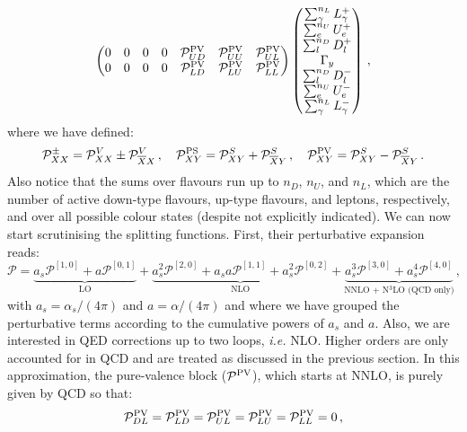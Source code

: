\documentclass[10pt,a4paper]{article}
\begin{document}
\begin{equation}
\begin{array}{rcl}
\begin{pmatrix}
0& 0& 0& 0 & \mathcal{P}^{\rm PV}_{UD} & \mathcal{P}^{\rm PV}_{UU} & \mathcal{P}^{\rm PV}_{UL}\\
0& 0&0 & 0 & \mathcal{P}^{\rm PV}_{LD} & \mathcal{P}^{\rm PV}_{LU} & \mathcal{P}^{\rm PV}_{LL}
\end{pmatrix}
\begin{pmatrix}
\sum_\gamma^{n_L} L_\gamma^+\\
\sum_e^{n_U} U_e^+ \\
\sum_l^{n_D} D_l^+\\
\Gamma_y\\
\sum_l^{n_D} D_l^-\\
\sum_e^{n_U} U_e^-\\
\sum_\gamma^{n_L} L_\gamma^-
\end{pmatrix}\,,
\end{array}
\end{equation}
where we have defined:
\begin{equation}
\mathcal{P}_{XX}^\pm=\mathcal{P}_{XX}^V\pm\mathcal{P}_{\overline{X}X}^V\,,\quad
\mathcal{P}_{XY}^{\rm PS} = \mathcal{P}^S_{XY}+\mathcal{P}^S_{\overline{X}Y}\,,\quad \mathcal{P}_{XY}^{\rm PV} = \mathcal{P}^S_{XY}-\mathcal{P}^S_{\overline{X}Y}\,.
\end{equation}
Also notice that the sums over flavours run up to $n_D$, $n_U$, and
$n_L$, which are the number of active down-type flavours, up-type
flavours, and leptons, respectively, and over all possible colour
states (despite not explicitly indicated).  We can now start
scrutinising the splitting functions. First, their perturbative
expansion reads:
\begin{equation}
\mathcal{P}= \underbrace{a_s
  \mathcal{P}^{[1,0]}+a\mathcal{P}^{[0,1]}}_{\mbox{LO}}+\underbrace{a_s^2\mathcal{P}^{[2,0]}+a_sa\mathcal{P}^{[1,1]}+a_s^2\mathcal{P}^{[0,2]}}_{\mbox{NLO}}+\underbrace{a_s^3\mathcal{P}^{[3,0]}+a_s^4\mathcal{P}^{[4,0]}}_{\mbox{NNLO
+ N$^3$LO (QCD only)}}\,,
\end{equation}
with $a_s=\alpha_s/(4\pi)$ and $a=\alpha/(4\pi)$ and where we have
grouped the perturbative terms according to the cumulative powers of
$a_s$ and $a$. Also, we are interested in QED corrections up to two
loops, \textit{i.e.} NLO. Higher orders are only accounted for in QCD
and are treated as discussed in the previous section. In this
approximation, the pure-valence block ($\mathcal{P}^{\rm PV}$), which
starts at NNLO, is purely given by QCD so that:
\begin{equation}
\mathcal{P}^{\rm PV}_{DL} = \mathcal{P}^{\rm PV}_{LD}=\mathcal{P}^{\rm PV}_{UL}=\mathcal{P}^{\rm PV}_{LU} =
\mathcal{P}^{\rm PV}_{LL} = 0\,,
\end{equation}
\end{document}
